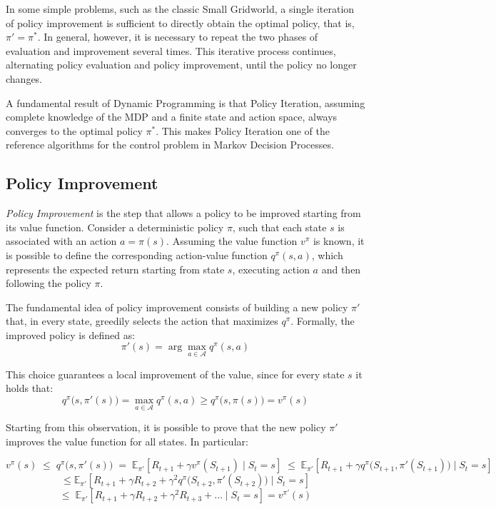 In some simple problems, such as the classic Small Gridworld, a single iteration of policy improvement is sufficient to directly obtain the optimal policy, that is, $\pi' = \pi^*$. In general, however, it is necessary to repeat the two phases of evaluation and improvement several times. This iterative process continues, alternating policy evaluation and policy improvement, until the policy no longer changes.

A fundamental result of Dynamic Programming is that Policy Iteration, assuming complete knowledge of the MDP and a finite state and action space, always converges to the optimal policy $\pi^*$. This makes Policy Iteration one of the reference algorithms for the control problem in Markov Decision Processes.

\subsection{Policy Improvement}

\emph{Policy Improvement} is the step that allows a policy to be improved starting from its value function. Consider a deterministic policy $\pi$, such that each state $s$ is associated with an action $a = \pi(s)$. Assuming the value function $v^\pi$ is known, it is possible to define the corresponding action-value function $q^\pi(s,a)$, which represents the expected return starting from state $s$, executing action $a$ and then following the policy $\pi$.

The fundamental idea of policy improvement consists of building a new policy $\pi'$ that, in every state, greedily selects the action that maximizes $q^\pi$. Formally, the improved policy is defined as:
\[
\pi'(s) = \arg\max_{a \in \mathcal{A}} q^\pi(s,a)
\]

This choice guarantees a local improvement of the value, since for every state $s$ it holds that:
\[
q^\pi\bigl(s,\pi'(s)\bigr)
= \max_{a \in \mathcal{A}} q^\pi(s,a)
\ge q^\pi\bigl(s,\pi(s)\bigr)
= v^\pi(s)
\]

Starting from this observation, it is possible to prove that the new policy $\pi'$ improves the value function for all states. In particular:

\[
v^\pi(s)
\;\le\;
q^\pi\bigl(s,\pi'(s)\bigr)
\;=\;
\mathbb{E}_{\pi'} \left[ R_{t+1} + \gamma v^\pi(S_{t+1}) \mid S_t = s \right]
\;\le\;
\mathbb{E}_{\pi'} \left[ R_{t+1} + \gamma q^\pi\bigl(S_{t+1},\pi'(S_{t+1})\bigr) \mid S_t = s \right]
\]
\[
\le
\mathbb{E}_{\pi'} \left[ R_{t+1} + \gamma R_{t+2} + \gamma^2 q^\pi\bigl(S_{t+2},\pi'(S_{t+2})\bigr) \mid S_t = s \right]
\]
\[
\le\;
\mathbb{E}_{\pi'} \left[ R_{t+1} + \gamma R_{t+2} + \gamma^2 R_{t+3} + \dots \mid S_t = s \right]
=
v^{\pi'}(s)
\]

